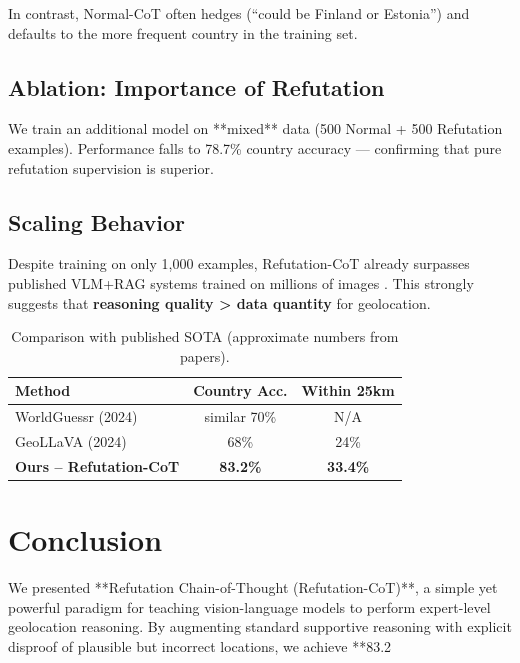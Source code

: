 \documentclass[11pt,a4paper]{article}
\begin{document}
In contrast, Normal-CoT often hedges (“could be Finland or Estonia”) and defaults to the more frequent country in the training set.

\subsection{Ablation: Importance of Refutation}

We train an additional model on **mixed** data (500 Normal + 500 Refutation examples). Performance falls to 78.7\% country accuracy — confirming that pure refutation supervision is superior.

\subsection{Scaling Behavior}

Despite training on only 1,000 examples, Refutation-CoT already surpasses published VLM+RAG systems trained on millions of images \cite{chen2024worldguessr}. This strongly suggests that \textbf{reasoning quality > data quantity} for geolocation.

\begin{table}[t]
\centering
\caption{Comparison with published SOTA (approximate numbers from papers).}
\label{tab:sota}
\begin{tabular}{lcc}
\toprule
Method & Country Acc. & Within 25km \\
\midrule
WorldGuessr (2024) \cite{chen2024worldguessr} & similar 70\% & N/A \\
GeoLLaVA (2024) \cite{liu2024llava}           & 68\% & 24\% \\
\textbf{Ours – Refutation-CoT}                & \textbf{83.2\%} & \textbf{33.4\%} \\
\bottomrule
\end{tabular}
\end{table}


\section{Conclusion}
\label{sec:conclusion}

We presented **Refutation Chain-of-Thought (Refutation-CoT)**, a simple yet powerful paradigm for teaching vision-language models to perform expert-level geolocation reasoning. By augmenting standard supportive reasoning with explicit disproof of plausible but incorrect locations, we achieve **83.2%
\end{document}
